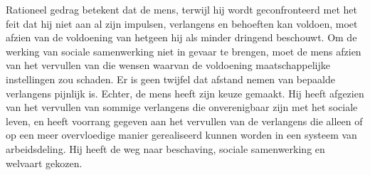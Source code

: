 \begin{blockquotebox}
Rationeel gedrag betekent dat de mens, terwijl hij wordt geconfronteerd met het feit dat hij niet aan al zijn impulsen, verlangens en behoeften kan voldoen, moet afzien van de voldoening van hetgeen hij als minder dringend beschouwt. Om de werking van sociale samenwerking niet in gevaar te brengen, moet de mens afzien van het vervullen van die wensen waarvan de voldoening maatschappelijke instellingen zou schaden. Er is geen twijfel dat afstand nemen van bepaalde verlangens pijnlijk is. Echter, de mens heeft zijn keuze gemaakt. Hij heeft afgezien van het vervullen van sommige verlangens die onverenigbaar zijn met het sociale leven, en heeft voorrang gegeven aan het vervullen van de verlangens die alleen of op een meer overvloedige manier gerealiseerd kunnen worden in een systeem van arbeidsdeling. Hij heeft de weg naar beschaving, sociale samenwerking en welvaart gekozen.\footnotemark
\end{blockquotebox}
\autocite{215}

